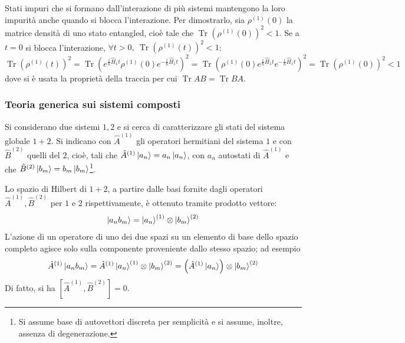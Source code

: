 \documentclass[11pt, a4paper]{scrartcl} %
\numberwithin{equation}{subsection}
\theoremstyle{style2}
\theoremstyle{style1}
\begin{document}
Stati impuri che si formano dall'interazione di pi\`u sistemi mantengono la loro impurit\`a anche quando si blocca l'interazione. 
Per dimostrarlo, sia $\rho ^{(1)} (0)$ la matrice densit\`a di uno stato entangled, cio\`e tale che $\operatorname{Tr} \left(\rho ^{(1)}(0) \right) ^2 < 1 $.
Se a $t=0$ si blocca l'interazione, $\forall t> 0 , \ \operatorname{Tr} \left(\rho ^{(1)} (t)\right) ^2 < 1$:
\[
\operatorname{Tr} \left(\rho ^{(1)} (t)\right) ^2 = \operatorname{Tr} \left(e^{\frac{i}{\hbar }\hat{H}_1 t} \rho ^{(1)} (0) e^{-\frac{i}{\hbar }\hat{H}_1 t} \right) ^2 = \operatorname{Tr} \left(\rho ^{(1)}(0)  e^{\frac{i}{\hbar }\hat{H}_1 t} e^{-\frac{i}{\hbar }\hat{H}_1 t}  \right) ^2 = \operatorname{Tr} \left(\rho ^{(1)} (0)\right) ^2 < 1
\] 
dove si \`e usata la propriet\`a della traccia per cui $\operatorname{Tr} AB = \operatorname{Tr} BA$.

\subsubsection{Teoria generica sui sistemi composti}

Si considerano due sistemi $1,2$ e si cerca di caratterizzare gli stati del sistema globale $1+2$.
Si indicano con $\hat{A}^{(1)} $ gli operatori hermitiani del sistema $1$ e con $\hat{B}^{(2)} $ quelli del $2$, cio\`e, tali che $\hat{A}^{(1)} \ket{a_n} = a_n \ket{a_n} $, con $a_n$ autostati di $\hat{A}^{(1)} $ e che $\hat{B}^{(2)} \ket{b_m} = b_m \ket{b_m} $\footnote{Si assume base di autovettori discreta per semplicit\`a e si assume, inoltre, assenza di degenerazione.}.

Lo spazio di Hilbert di $1+2$, a partire dalle basi fornite dagli operatori $\hat{A}^{(1)} , \hat{B}^{(2)} $ per $1 $ e $2$ rispettivamente, \`e ottenuto tramite prodotto vettore:
\begin{equation}
	\ket{a_n b_m} = \ket{a_n}^{(1)}  \otimes \ket{b_m}^{(2)}  
\end{equation}
L'azione di un operatore di uno dei due spazi su un elemento di base dello spazio completo agisce solo sulla componente proveniente dallo stesso spazio; ad esempio
\[
\hat{A}^{(1)} \ket{a_n b_m} = \hat{A}^{(1)} \ket{a_n} ^{(1)} \otimes \ket{b_m} ^{(2)} = \left(\hat{A}^{(1)} \ket{a_n} \right) \otimes \ket{b_m} ^{(2)} 
\] 
Di fatto, si ha $\left[ \hat{A}^{(1)} , \hat{B}^{(2)}  \right] = 0$.
\end{document}
